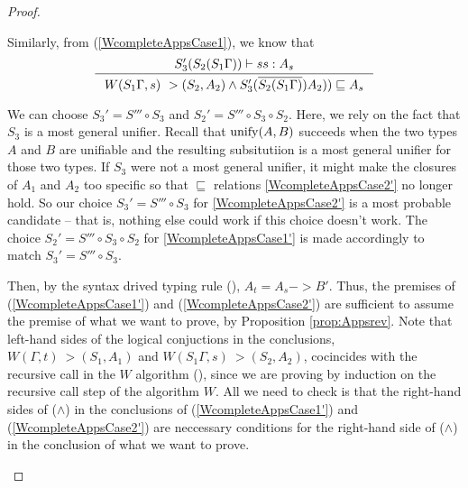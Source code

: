 \begin{proof}
\begin{itemize}
        Similarly, from (\ref{WcompleteAppsCase1}), we know that
        \begin{equation}
        \inference{ S_3'(S_2(S_1\Gamma)) |-s s : A_s}{
                W(S_1\Gamma,s) ~> (S_2,A_2) \land
                S_3'(\overline{S_2(S_1\Gamma)})A_2))\sqsubseteq A_s }
        \label{WcompleteAppsCase2'}
        \end{equation}

        We can choose $S_3'=S'''\circ S_3$ and $S_2' = S'''\circ S_3 \circ S_2$.
	Here, we rely on the fact that $S_3$ is a most general unifier.
	Recall that $\mathop{\mathrm{unify}}(A,B)$ succeeds when the two types $A$ and $B$
	are unifiable and the resulting subsitutiion is a most general unifier
	for those two types. If $S_3$ were not a most general unifier, it might
	make the closures of $A_1$ and $A_2$ too specific so that $\sqsubseteq$
	relations \ref{WcompleteAppsCase2'} no longer hold.
	So our choice $S_3'=S'''\circ S_3$ for \ref{WcompleteAppsCase2'} is
	a most probable candidate -- that is, nothing else could work if
	this choice doesn't work. The choice $S_2' = S'''\circ S_3 \circ S_2$
	for \ref{WcompleteAppsCase1'} is made accordingly
	to match $S_3'=S'''\circ S_3$.

        Then, by the syntax drived typing rule (),
        $A_t = A_s -> B'$. Thus, the premises of (\ref{WcompleteAppsCase1'})
        and (\ref{WcompleteAppsCase2'}) are sufficient to assume the premise
        of what we want to prove, by Proposition \ref{prop:Appsrev}.
        Note that left-hand sides of the logical conjuctions in the conclusions,
        $W(\Gamma,t) ~> (S_1,A_1)$ and $W(S_1\Gamma,s) ~> (S_2,A_2)$, cocincides
        with the recursive call in the $W$ algorithm (),
        since we are proving by induction on the recursive call step of
        the algorithm $W$. All we need to check is that the right-hand sides
        of ($\land$) in the conclusions of (\ref{WcompleteAppsCase1'}) and
        (\ref{WcompleteAppsCase2'}) are neccessary conditions for
        the right-hand side of ($\land$) in the conclusion of
        what we want to prove.


\end{itemize}
\end{proof}
